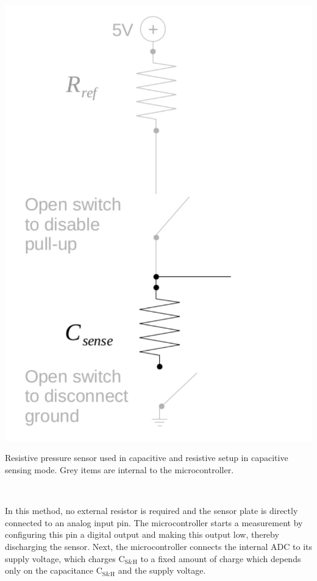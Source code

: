 \documentclass{sigchi-ext}
\begin{document}
\begin{marginfigure}
\begin{minipage}{\marginparwidth}
\centering
\includegraphics[width=0.9\columnwidth]{figures/cap_res_setup_cap}
\caption{Resistive pressure sensor used in capacitive and resistive setup in
capacitive sensing mode. Grey items are internal to the
microcontroller.}~\label{fig:cap_res_setup_cap}
\end{minipage}
\end{marginfigure}

In this method, no external resistor is required and the sensor plate is
directly connected to an analog input pin. The microcontroller starts a
measurement by configuring this pin a digital output and making this output low,
thereby discharging the sensor. Next, the microcontroller connects the internal
ADC to its supply voltage, which charges $\textrm{C}_{\textrm{S\&H}}$ to a fixed
amount of charge which depends only on the capacitance
$\textrm{C}_{\textrm{S\&H}}$ and the supply voltage.
\end{document}

